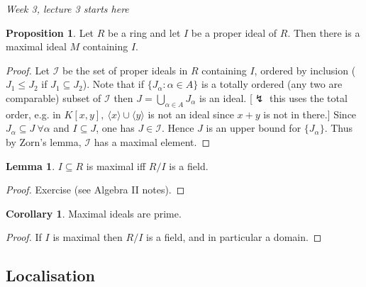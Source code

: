 \documentclass[a4paper]{article}
\theoremstyle{definition}
\newtheorem{prop}[defn]{Proposition}
\newtheorem{lemma}[defn]{Lemma}
\newtheorem{coro}[defn]{Corollary}
\begin{document}
\begin{flushright}
\textit{Week 3, lecture 3 starts here}
\end{flushright}

\begin{prop}
Let $R$ be a ring and let $I$ be a proper ideal of $R$. Then there is a maximal ideal $M$ containing $I$.
\end{prop}
\begin{proof}
Let $\mathcal I$ be the set of proper ideals in $R$ containing $I$, ordered by inclusion ($J_1\leq J_2$ if $J_1\subseteq J_2$). Note that if $\{J_\alpha:\alpha\in A\}$ is a totally ordered (any two are comparable) subset of $\mathcal I$ then $J=\bigcup_{\alpha\in A}J_\alpha$ is an ideal. [$\lightning$ this uses the total order, e.g. in $K[x,y],\ \langle x\rangle \cup\langle y\rangle$ is not an ideal since $x+y$ is not in there.] Since $J_\alpha\subseteq J \ \forall \alpha$ and $I\subseteq J$, one has $J\in \mathcal I$. Hence $J$ is an upper bound for $\{J_\alpha\}$. Thus by Zorn's lemma, $\mathcal I$ has a maximal element.
\end{proof}

\begin{lemma}
$I\subseteq R$ is maximal iff $R/I$ is a field.
\end{lemma}
\begin{proof}
Exercise (see Algebra II notes).
\end{proof}

\begin{coro}
Maximal ideals are prime.
\end{coro}
\begin{proof}
If $I$ is maximal then $R/I$ is a field, and in particular a domain.
\end{proof}

\subsection{Localisation}
\end{document}
